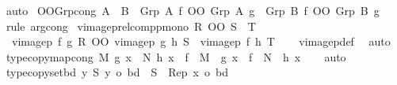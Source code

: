 \begin{isabellebody}
\ auto%
\endisatagproof
{\isafoldproof}%
%
\isadelimproof
\isanewline
%
\endisadelimproof
\isanewline
{}\isamarkupfalse%
\ OO{\isacharunderscore}{\kern0pt}Grp{\isacharunderscore}{\kern0pt}cong{\isacharcolon}{\kern0pt}\ {\isachardoublequoteopen}A\ {\isacharequal}{\kern0pt}\ B\ {\isasymLongrightarrow}\ {\isacharparenleft}{\kern0pt}Grp\ A\ f{\isacharparenright}{\kern0pt}{\isasyminverse}{\isasyminverse}\ OO\ Grp\ A\ g\ {\isacharequal}{\kern0pt}\ {\isacharparenleft}{\kern0pt}Grp\ B\ f{\isacharparenright}{\kern0pt}{\isasyminverse}{\isasyminverse}\ OO\ Grp\ B\ g{\isachardoublequoteclose}\isanewline
%
\isadelimproof
\ \ %
\endisadelimproof
%
\isatagproof
{}\isamarkupfalse%
\ {\isacharparenleft}{\kern0pt}rule\ arg{\isacharunderscore}{\kern0pt}cong{\isacharparenright}{\kern0pt}%
\endisatagproof
{\isafoldproof}%
%
\isadelimproof
\isanewline
%
\endisadelimproof
\isanewline
{}\isamarkupfalse%
\ vimage{}p{\isacharunderscore}{\kern0pt}relcompp{\isacharunderscore}{\kern0pt}mono{\isacharcolon}{\kern0pt}\ {\isachardoublequoteopen}R\ OO\ S\ {\isasymle}\ T\ {\isasymLongrightarrow}\isanewline
\ \ vimage{}p\ f\ g\ R\ OO\ vimage{}p\ g\ h\ S\ {\isasymle}\ vimage{}p\ f\ h\ T{\isachardoublequoteclose}\isanewline
%
\isadelimproof
\ \ %
\endisadelimproof
%
\isatagproof
{}\isamarkupfalse%
\ vimage{}p{\isacharunderscore}{\kern0pt}def\ \isamarkupfalse%
\ auto%
\endisatagproof
{\isafoldproof}%
%
\isadelimproof
\isanewline
%
\endisadelimproof
\isanewline
{}\isamarkupfalse%
\ type{\isacharunderscore}{\kern0pt}copy{\isacharunderscore}{\kern0pt}map{\isacharunderscore}{\kern0pt}cong{}{\isacharcolon}{\kern0pt}\ {\isachardoublequoteopen}M\ {\isacharparenleft}{\kern0pt}g\ x{\isacharparenright}{\kern0pt}\ {\isacharequal}{\kern0pt}\ N\ {\isacharparenleft}{\kern0pt}h\ x{\isacharparenright}{\kern0pt}\ {\isasymLongrightarrow}\ {\isacharparenleft}{\kern0pt}f\ {\isasymcirc}\ M\ {\isasymcirc}\ g{\isacharparenright}{\kern0pt}\ x\ {\isacharequal}{\kern0pt}\ {\isacharparenleft}{\kern0pt}f\ {\isasymcirc}\ N\ {\isasymcirc}\ h{\isacharparenright}{\kern0pt}\ x{\isachardoublequoteclose}\isanewline
%
\isadelimproof
\ \ %
\endisadelimproof
%
\isatagproof
{}\isamarkupfalse%
\ auto%
\endisatagproof
{\isafoldproof}%
%
\isadelimproof
\isanewline
%
\endisadelimproof
\isanewline
{}\isamarkupfalse%
\ type{\isacharunderscore}{\kern0pt}copy{\isacharunderscore}{\kern0pt}set{\isacharunderscore}{\kern0pt}bd{\isacharcolon}{\kern0pt}\ {\isachardoublequoteopen}{\isacharparenleft}{\kern0pt}{\isasymAnd}y{\isachardot}{\kern0pt}\ {\isacharbar}{\kern0pt}S\ y{\isacharbar}{\kern0pt}\ {\isasymle}o\ bd{\isacharparenright}{\kern0pt}\ {\isasymLongrightarrow}\ {\isacharbar}{\kern0pt}{\isacharparenleft}{\kern0pt}S\ {\isasymcirc}\ Rep{\isacharparenright}{\kern0pt}\ x{\isacharbar}{\kern0pt}\ {\isasymle}o\ bd{\isachardoublequoteclose}\isanewline

\end{isabellebody}
